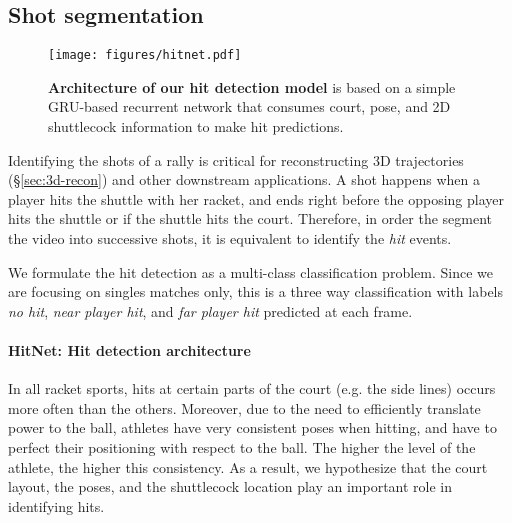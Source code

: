 \subsection{Shot segmentation}
\label{sec:shot_segmentation}
\begin{figure}[ht]
    \centering
    \texttt{[image: figures/hitnet.pdf]}
    \caption{{\bf Architecture of our hit detection model} is based on a simple GRU-based recurrent network that consumes court, pose, and 2D shuttlecock information to make hit predictions.}
    \label{fig:hitnet}
\end{figure}

Identifying the shots of a rally is critical for reconstructing 3D trajectories (\S\ref{sec:3d-recon}) and other downstream applications. A shot happens when a player hits the shuttle with her racket, and ends right before the opposing player hits the shuttle or if the shuttle hits the court. Therefore, in order the segment the video into successive shots, it is equivalent to identify the \emph{hit} events.

We formulate the hit detection as a multi-class classification problem. Since we are focusing on singles matches only, this is a three way classification with labels \emph{no hit}, \emph{near player hit}, and \emph{far player hit} predicted at each frame.

\paragraph{HitNet: Hit detection architecture} In all racket sports, hits at certain parts of the court (e.g. the side lines) occurs more often than the others. Moreover, due to the need to efficiently translate power to the ball, athletes have very consistent poses when hitting, and have to perfect their positioning with respect to the ball. The higher the level of the athlete, the higher this consistency. As a result, we hypothesize that the court layout, the poses, and the shuttlecock location play an important role in identifying hits.

